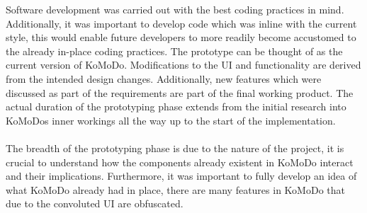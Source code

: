   Software development was carried out with the best coding practices in mind. Additionally, it was important to develop code which was inline with the current style, this would enable future developers to more readily become accustomed to the already in-place coding practices.
  The prototype can be thought of as the current version of KoMoDo. Modifications to the UI and functionality are derived from the intended design changes. Additionally, new features which were discussed as part of the requirements are part of the final working product. The actual duration of the prototyping phase extends from the initial research into KoMoDos inner workings all the way up to the start of the implementation. \\\\
  The breadth of the prototyping phase is due to the nature of the project, it is crucial to understand how the components already existent in KoMoDo interact and their implications. Furthermore, it was important to fully develop an idea of what KoMoDo already had in place, there are many features in KoMoDo that due to the convoluted UI are obfuscated.
